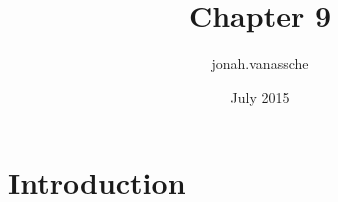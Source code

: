 \documentclass{article}
\title{Chapter 9}
\author{jonah.vanassche }
\date{July 2015}
\begin{document}
\maketitle

\section{Introduction}
\end{document}
